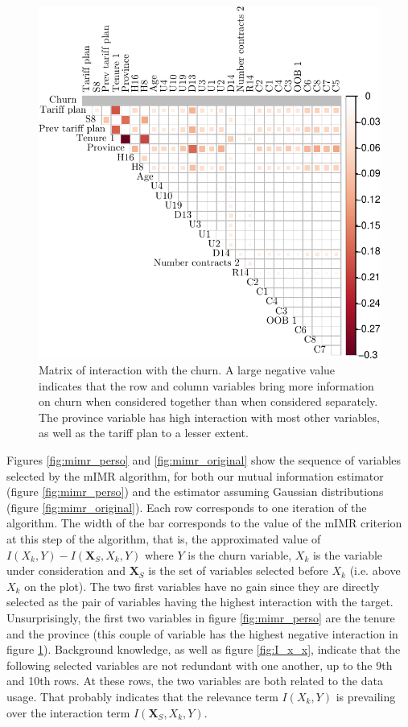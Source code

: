 \begin{figure}
    \centering
    \includegraphics[width=0.8\linewidth]{figures/I_x_x_inter.pdf}
    \caption{Matrix of interaction with the churn. A large negative value
    indicates that the row and column variables bring more information on churn
    when considered together than when considered separately. The  province
    variable has high interaction with most other variables, as well as the
    tariff plan to a lesser extent.}
    \label{fig:I_x_x_inter}
\end{figure}

Figures \ref{fig:mimr_perso} and \ref{fig:mimr_original} show the sequence of
variables selected by the mIMR algorithm, for both our mutual information
estimator (figure \ref{fig:mimr_perso}) and the estimator assuming Gaussian
distributions (figure \ref{fig:mimr_original}). Each row corresponds to one
iteration of the algorithm. The width of the bar corresponds to the value of the
mIMR criterion at this step of the algorithm, that is, the approximated value of
$I(X_k, Y) - I(\bm X_S, X_k, Y)$ where $Y$ is the churn variable, $X_k$ is the
variable under consideration and $\bm X_S$ is the set of variables selected
before $X_k$ (i.e. above $X_k$ on the plot). The two first variables have no
gain since they are directly selected as the pair of variables having the
highest interaction with the target. Unsurprisingly, the first two variables in
figure \ref{fig:mimr_perso} are the tenure and the province (this couple of
variable has the highest negative interaction in figure \ref{fig:I_x_x_inter}).
Background knowledge, as well as figure \ref{fig:I_x_x}, indicate that the
following selected variables are not redundant with one another, up to the 9th
and 10th rows. At these rows, the two variables are both related to the data
usage. That probably indicates that the relevance term $I(X_k, Y)$ is prevailing
over the interaction term $I(\bm X_S, X_k, Y)$.


